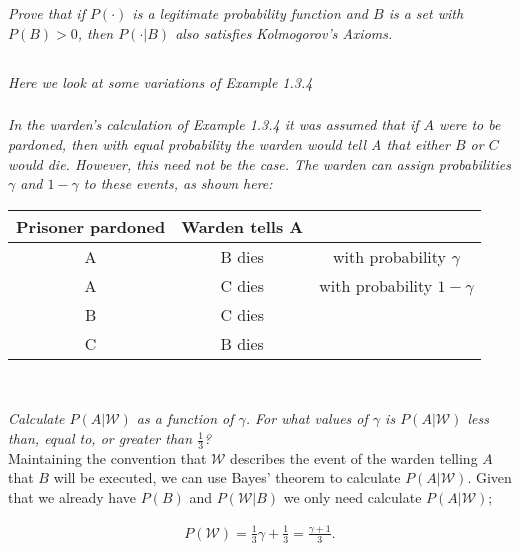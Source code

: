 \documentclass[12pt]{amsart}
\begin{document}
\setcounter{subsection}{34}
\subsection{} %
\textit{Prove that if \(P(\cdot)\) is a legitimate probability function and \(B\) is a set with \(P (B) > 0\),
	then \(P (\cdot|B)\) also satisfies Kolmogorov’s Axioms.}

\setcounter{subsection}{36}
\subsection{} %
\textit{Here we look at some variations of Example 1.3.4}
	\subsubsection{}
	\textit{ In the warden’s calculation of Example 1.3.4 it was assumed that if \(A\) were to be
		pardoned, then with equal probability the warden would tell A that either \(B\) or \(C\)
		would die. However, this need not be the case. The warden can assign probabilities
		\(\gamma\) and \(1 − \gamma\) to these events, as shown here:} \\
	\begin{center}
		\begin{tabular}{ccc}
			\toprule
			Prisoner pardoned & Warden tells A & \\
			\midrule
			A & B dies & with probability \(\gamma\) \\
			A & C dies & with probability \(1-\gamma\) \\
			B & C dies & \\
			C & B dies & \\
			\bottomrule
		\end{tabular} \\[1.5em]
	\end{center}
	\textit{Calculate \(P(A|\mathcal W)\) as a function of \(\gamma\). For what values of \(\gamma\) is \(P(A|\mathcal W)\) less than,
		equal to, or greater than \(\frac 1 3\)?} \\
		
	Maintaining the convention that \(\mathcal W\) describes the event of the warden telling $A$ that $B$ will be executed,
	we can use Bayes' theorem to calculate \(P(A|\mathcal W)\). Given that we already have \(P(B)\) and \(P(\mathcal W|B)\) we only
	need calculate \(P(A|\mathcal W)\);
	
	\begin{align*}
		P(\mathcal W) = \frac{1}{3} \gamma + \frac{1}{3}
		= \frac{\gamma+1}{3}. \\
	\end{align*}
	
\end{document}
